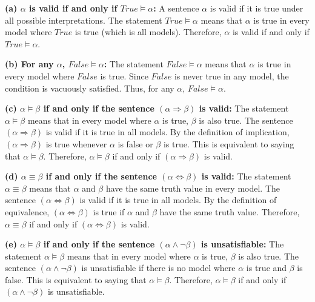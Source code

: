 \documentclass[cn,12pt]{homework}
\begin{document}
\begin{solution}
  
\textbf{(a) $\alpha$ is valid if and only if $True \models \alpha$:}  
A sentence $\alpha$ is valid if it is true under all possible interpretations. The statement $True \models \alpha$ means that $\alpha$ is true in every model where $True$ is true (which is all models). Therefore, $\alpha$ is valid if and only if $True \models \alpha$.

\textbf{(b) For any $\alpha$, $False \models \alpha$:}  
The statement $False \models \alpha$ means that $\alpha$ is true in every model where $False$ is true. Since $False$ is never true in any model, the condition is vacuously satisfied. Thus, for any $\alpha$, $False \models \alpha$.

\textbf{(c) $\alpha \models \beta$ if and only if the sentence $(\alpha \Rightarrow \beta)$ is valid:}  
The statement $\alpha \models \beta$ means that in every model where $\alpha$ is true, $\beta$ is also true. The sentence $(\alpha \Rightarrow \beta)$ is valid if it is true in all models. By the definition of implication, $(\alpha \Rightarrow \beta)$ is true whenever $\alpha$ is false or $\beta$ is true. This is equivalent to saying that $\alpha \models \beta$. Therefore, $\alpha \models \beta$ if and only if $(\alpha \Rightarrow \beta)$ is valid.

\textbf{(d) $\alpha \equiv \beta$ if and only if the sentence $(\alpha \Leftrightarrow \beta)$ is valid:}  
The statement $\alpha \equiv \beta$ means that $\alpha$ and $\beta$ have the same truth value in every model. The sentence $(\alpha \Leftrightarrow \beta)$ is valid if it is true in all models. By the definition of equivalence, $(\alpha \Leftrightarrow \beta)$ is true if $\alpha$ and $\beta$ have the same truth value. Therefore, $\alpha \equiv \beta$ if and only if $(\alpha \Leftrightarrow \beta)$ is valid.

\textbf{(e) $\alpha \models \beta$ if and only if the sentence $(\alpha \land \neg \beta)$ is unsatisfiable:}  
The statement $\alpha \models \beta$ means that in every model where $\alpha$ is true, $\beta$ is also true. The sentence $(\alpha \land \neg \beta)$ is unsatisfiable if there is no model where $\alpha$ is true and $\beta$ is false. This is equivalent to saying that $\alpha \models \beta$. Therefore, $\alpha \models \beta$ if and only if $(\alpha \land \neg \beta)$ is unsatisfiable.
\end{solution}











\end{document}
